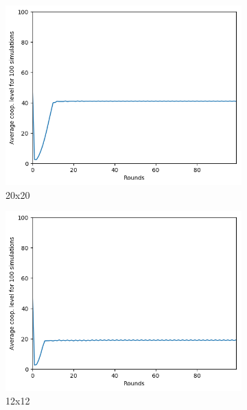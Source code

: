 \documentclass[letterpaper]{article}
\begin{document}
\begin{figure}
    \begin{subfigure}{.5\textwidth}
        \centering
        \includegraphics[width=1\linewidth]{images/assign2/20-part1}
        \caption{20x20}
        \label{fig:20moorepart1}
    \end{subfigure}
    \begin{subfigure}{.5\textwidth}
        \centering
        \includegraphics[width=1\linewidth]{images/assign2/12-part1}
        \caption{12x12}
        \label{fig:12moorepart1}
    \end{subfigure}
    \begin{subfigure}{.5\textwidth}

\end{subfigure}
\end{figure}
\end{document}
